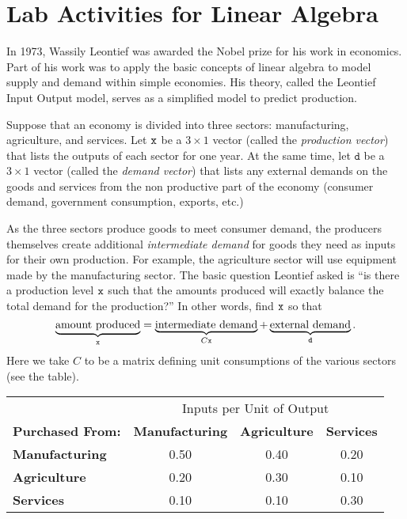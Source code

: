 \section{Lab Activities for Linear Algebra}
In 1973, Wassily Leontief was awarded the Nobel prize for his work in economics.  Part of
his work was to apply the basic concepts of linear algebra to model supply and demand
within simple economies.  His theory, called the Leontief Input Output model, serves as a
simplified model to predict production.

% 
\begin{lab}\label{PA:10.5}
    Suppose that an economy is divided into three sectors: manufacturing, agriculture, and
    services.  Let $\texttt{x}$ be a $3 \times 1$ vector (called the {\it production vector})
    that lists the outputs of each sector for one year.  At the same time, let $\texttt{d}$ be a
    $3 \times 1$ vector (called the {\it demand vector}) that lists any external demands
    on the goods and services from the non productive part of the economy (consumer
    demand, government consumption, exports, etc.)   

    As the three sectors produce goods to meet consumer demand, the producers themselves
    create additional {\it intermediate demand} for goods they need as inputs for their
    own production.  For example, the agriculture sector will use equipment made by the
    manufacturing sector. The basic question Leontief asked is ``is there a production
    level $\texttt{x}$ such that the amounts produced will exactly balance the total demand for
    the production?'' In other words, find $\texttt{x}$ so that
    \[ \underbrace{\text{amount produced}}_{\texttt{x}} = \underbrace{\text{intermediate
    demand}}_{C\texttt{x}} + \underbrace{\text{external demand}}_{\texttt{d}}. \]
    Here we take $C$ to be a matrix defining unit consumptions of the various sectors (see
    the table).

    \begin{center}
        \begin{tabular}{lccc}
            \hline
            & \multicolumn{3}{c}{Inputs per Unit of Output} \\ 
            {\bf Purchased From:} & {\bf Manufacturing} & {\bf Agriculture} & {\bf
            Services} \\ \hline \hline
            {\bf Manufacturing} &0.50  &0.40  &0.20  \\
            {\bf Agriculture} &0.20  &0.30  &0.10  \\
            {\bf Services} & 0.10 &0.10  &0.30  \\ \hline
        \end{tabular}
    \end{center}


\end{lab}
